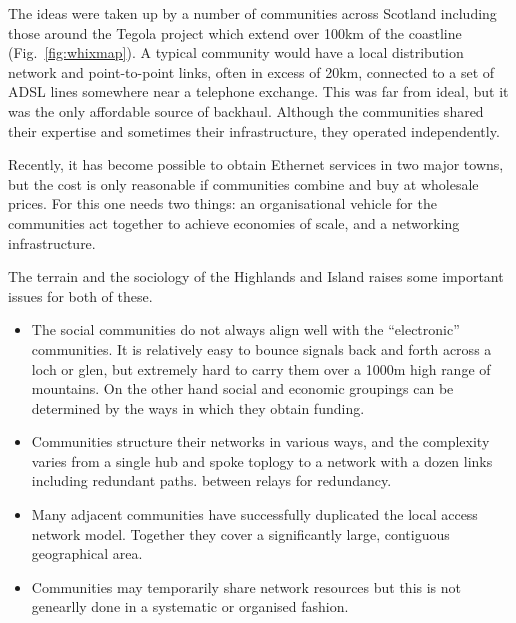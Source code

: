 The ideas were taken up by a number of communities across Scotland
including those around the Tegola project which extend over 100km of
the coastline (Fig.~\ref{fig:whixmap}). A typical community would have
a local distribution network and point-to-point links, often in excess
of 20km, connected to a set of ADSL lines somewhere near a telephone
exchange. This was far from ideal, but it was the only affordable
source of backhaul. Although the communities shared their expertise
and sometimes their infrastructure, they operated independently.

Recently, it has become possible to obtain Ethernet services in two
major towns, but the cost is only reasonable if communities combine
and buy at wholesale prices.  For this one needs two things: an
organisational vehicle for the communities act together to achieve
economies of scale, and a networking infrastructure.

The terrain and the sociology of the Highlands and Island raises some
important issues for both of these.
\begin{itemize}
\item The social communities do not always align well with the
  ``electronic'' communities. It is relatively easy to bounce signals
  back and forth across a loch or glen, but extremely hard to carry
  them over a 1000m high range of mountains. On the other hand
  social and economic groupings can be determined by the ways in which
  they obtain funding.%
\item Communities structure their networks in various ways, and the
  complexity varies from a single hub and spoke toplogy to a network
  with a dozen links including redundant paths.
  between relays for redundancy.
\item Many adjacent communities have successfully duplicated the local
  access network model. Together they cover a significantly large,
  contiguous geographical area.
\item Communities may temporarily share network resources but this is
  not genearlly done in a systematic or organised fashion.
\end{itemize}

